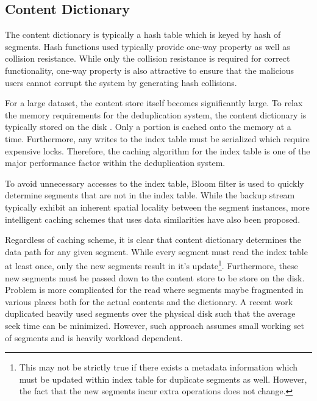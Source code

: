 \subsection{Content Dictionary}
The content dictionary is typically a hash table which is keyed by hash of segments. Hash functions used typically provide one-way property as well as collision resistance. While only the collision resistance is required for correct functionality, one-way property is also attractive to ensure that the malicious users cannot corrupt the system by generating hash collisions.

For a large dataset, the content store itself becomes significantly large. To relax the memory requirements for the deduplication system, the content dictionary is typically stored on the disk\cite{Mandagere:2008:DDD:1462735.1462739, Lillibridge:2009:SIL:1525908.1525917, Zhu:2008:ADB:1364813.1364831, 5366623} . Only a portion is cached onto the memory at a time. Furthermore, any writes to the index table must be serialized which require expensive locks\cite{clements2009decentralized}. Therefore, the caching algorithm for the index table is one of the major performance factor within the deduplication system.

To avoid unnecessary accesses to the index table, Bloom filter \cite{Bloom:1970:STH:362686.362692} is used to quickly determine segments that are not in the index table\cite{Zhu:2008:ADB:1364813.1364831}. While the backup stream typically exhibit an inherent spatial locality between the segment instances\cite{Zhu:2008:ADB:1364813.1364831}, more intelligent caching schemes that uses data similarities have also been proposed\cite{Lillibridge:2009:SIL:1525908.1525917, 5366623}.

Regardless of caching scheme, it is clear that content dictionary determines the data path for any given segment. While every segment must read the index table at least once, only the new segments result in it's update\footnote{This may not be strictly true if there exists a metadata information which must be updated within index table for duplicate segments as well. However, the fact that the new segments incur extra operations does not change.}. Furthermore, these new segments must be passed down to the content store to be store on the disk. Problem is more complicated for the read where segments maybe fragmented in various places both for the actual contents and the dictionary. A recent work duplicated heavily used segments over the physical disk such that the average seek time can be minimized\cite{citeulike:6856151}. However, such approach assumes small working set of segments and is heavily workload dependent.

